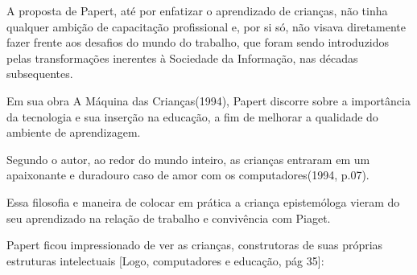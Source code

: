 \documentclass[
12pt,		%
openright,	%
twoside,  %
a4paper,			%
chapter=TITLE,		%
english,			%
french,				%
spanish,			%
brazil				%
]{USPSC-classe/USPSC}
\begin{document}
A proposta de Papert, at\'e por enfatizar o aprendizado de crian\c{c}as, n\~ao tinha qualquer ambi\c{c}\~ao de capacita\c{c}\~ao profissional e, por si s\'o, n\~ao visava diretamente fazer frente aos desafios do \textquotedbl mundo do trabalho\textquotedbl , que foram sendo introduzidos pelas transforma\c{c}\~oes inerentes \`a Sociedade da Informa\c{c}\~ao, nas d\'ecadas subsequentes.














Em sua obra \textquotedbl A M\'aquina das Crian\c{c}as\textquotedbl  (1994), Papert discorre sobre a import\^ancia da tecnologia e sua inser\c{c}\~ao na educa\c{c}\~ao, a fim de melhorar a qualidade do ambiente de aprendizagem.














Segundo o autor, \textquotedbl ao redor do mundo inteiro, as crian\c{c}as entraram em um apaixonante e duradouro caso de amor com os computadores\textquotedbl  (1994, p.07).














Essa filosofia e maneira de colocar em pr\'atica a crian\c{c}a epistem\'ologa vieram do seu aprendizado na rela\c{c}\~ao de trabalho e conviv\^encia com Piaget.














Papert ficou impressionado de ver as crian\c{c}as, construtoras de suas pr\'oprias estruturas intelectuais [Logo, computadores e educa\c{c}\~ao, p\'ag 35]:
\end{document}
